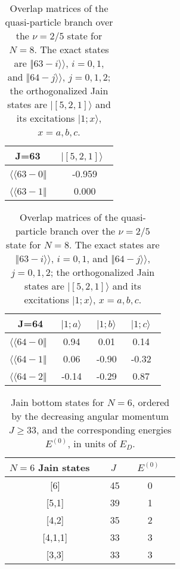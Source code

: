 \begin{table}
\caption{Overlap matrices of the quasi-particle branch over the
$\nu=2/5$ state for $N=8$. The exact states are
$\Vert 63-i \rangle\rangle$, $i=0,1$, and 
$\Vert 64-j \rangle\rangle$, $j=0,1,2$; 
the orthogonalized Jain states are
$\vert [5,2,1] \rangle$ and its excitations
$\vert 1; x\rangle$, $x=a,b,c$.} 
\label{tab30}
\vspace{0.4cm}
\begin{center}
\begin{tabular}{|c|c|}
\hline 
J=63\  & $\vert [5,2,1] \rangle$\ \\ 
\hline
$\langle\langle 63- 0\Vert$\  &-0.959 \\ 
$\langle\langle 63- 1\Vert$\  & 0.000 \\
\end{tabular}
\begin{tabular}{|c|c|c|c|} 
J=64 & $\vert 1;a\rangle$\ & $\vert 1;b\rangle$\ & $\vert 1;c\rangle$\  \\ 
\hline
$\langle\langle 64-0\Vert$\ & 0.94\ & 0.01\ & 0.14\ \\
$\langle\langle 64-1\Vert$\ & 0.06\ &-0.90\ &-0.32\ \\
$\langle\langle 64-2\Vert$\ &-0.14\ &-0.29\ & 0.87\ \\
\hline
\end{tabular}
\end{center}
\end{table}

\begin{table}
\caption{Jain bottom states for $N=6$, ordered by the 
decreasing angular momentum $J \ge 33$, and the corresponding
energies $E^{(0)}$, in units of $E_D$.}
\label{tab4}
\vspace{0.4cm}
\begin{center}
\begin{tabular}{|c|c|c|} 
\hline
$N=6$ Jain states\ \ &  $J$\ \ & $E^{(0)}$\ \ \\ 
\hline
{[6]}     &   45 \  &   0 \ \\
{[5,1]}   &   39 \  &   1 \ \\
{[4,2] }  &   35 \  &   2 \ \\ 
\hline
{[4,1,1]} &   33 \  &   3 \ \\
{[3,3] }  &   33 \  &   3 \ \\
\hline
\end{tabular}
\end{center}
\end{table}

